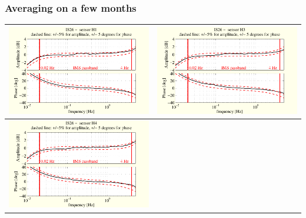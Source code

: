 \documentclass[handout,9pt]{beamer}
\begin{document}
\begin{frame}
\frametitle{Averaging on a few months}
\begin{tabular}{c||c}
\includegraphics[scale=0.35]{3monthsonIS26SUTboxplot1.pdf}
&
\includegraphics[scale=0.35]{3monthsonIS26SUTboxplot3.pdf}
\\
\hline\hline
\includegraphics[scale=0.35]{3monthsonIS26SUTboxplot4.pdf}

\end{tabular}
\end{frame}
\end{document}
